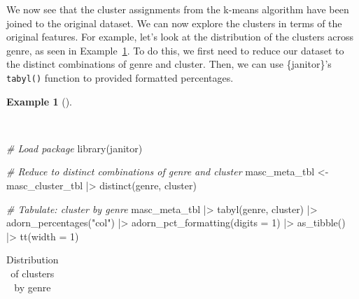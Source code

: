 \documentclass[
  letterpaper,
  krantz1]{latex/krantz-mod}
\newenvironment{Shaded}{\begin{snugshade}}{\end{snugshade}}
\newcommand{\AttributeTok}[1]{\textcolor[rgb]{0.00,0.00,0.00}{#1}}
\newcommand{\CommentTok}[1]{\textcolor[rgb]{0.00,0.00,0.00}{\textit{#1}}}
\newcommand{\DecValTok}[1]{\textcolor[rgb]{0.00,0.00,0.00}{#1}}
\newcommand{\FunctionTok}[1]{\textcolor[rgb]{0.00,0.00,0.00}{#1}}
\newcommand{\NormalTok}[1]{\textcolor[rgb]{0.00,0.00,0.00}{#1}}
\newcommand{\OtherTok}[1]{\textcolor[rgb]{0.00,0.00,0.00}{#1}}
\newcommand{\SpecialCharTok}[1]{\textcolor[rgb]{0.00,0.00,0.00}{#1}}
\newcommand{\StringTok}[1]{\textcolor[rgb]{0.00,0.00,0.00}{#1}}
\theoremstyle{definition}
\theoremstyle{definition}
\newtheorem{example}{Example}[chapter]
\theoremstyle{remark}
\begin{document}
We now see that the cluster assignments from the k-means algorithm have
been joined to the original dataset. We can now explore the clusters in
terms of the original features. For example, let's look at the
distribution of the clusters across genre, as seen
in Example~\ref{exm-explore-masc-pos-kmeans-genre}. To do this, we first
need to reduce our dataset to the distinct combinations of genre and
cluster. Then, we can use \{janitor\}'s \texttt{tabyl()} function to
provided formatted percentages.

\begin{example}[]\protect\hypertarget{exm-explore-masc-pos-kmeans-genre}{}\label{exm-explore-masc-pos-kmeans-genre}

~

\begin{Shaded}
\begin{Highlighting}[numbers=left,,]
\CommentTok{\# Load package}
\FunctionTok{library}\NormalTok{(janitor)}

\CommentTok{\# Reduce to distinct combinations of genre and cluster}
\NormalTok{masc\_meta\_tbl }\OtherTok{\textless{}{-}}
\NormalTok{  masc\_cluster\_tbl }\SpecialCharTok{|\textgreater{}}
  \FunctionTok{distinct}\NormalTok{(genre, cluster)}

\CommentTok{\# Tabulate: cluster by genre}
\NormalTok{masc\_meta\_tbl }\SpecialCharTok{|\textgreater{}}
  \FunctionTok{tabyl}\NormalTok{(genre, cluster) }\SpecialCharTok{|\textgreater{}}
  \FunctionTok{adorn\_percentages}\NormalTok{(}\StringTok{"col"}\NormalTok{) }\SpecialCharTok{|\textgreater{}}
  \FunctionTok{adorn\_pct\_formatting}\NormalTok{(}\AttributeTok{digits =} \DecValTok{1}\NormalTok{) }\SpecialCharTok{|\textgreater{}}
  \FunctionTok{as\_tibble}\NormalTok{() }\SpecialCharTok{|\textgreater{}}
  \FunctionTok{tt}\NormalTok{(}\AttributeTok{width =} \DecValTok{1}\NormalTok{)}
\end{Highlighting}
\end{Shaded}

\begin{longtable}[]{@{}
  >{\raggedright\arraybackslash}p{}
  >{\raggedright\arraybackslash}p{}
  >{\raggedright\arraybackslash}p{}
  >{\raggedright\arraybackslash}p{}
  >{\raggedright\arraybackslash}p{}@{}}

\caption{\label{tbl-explore-masc-pos-kmeans-genre}Distribution of
clusters by genre}


\end{longtable}
\end{example}
\end{document}
